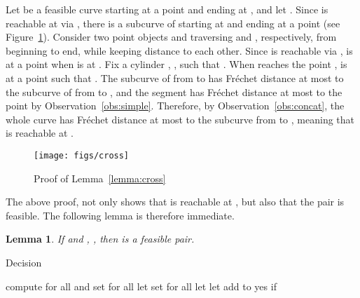 \documentclass[12pt]{dalthesis}
\def\favoritefont{\bfseries \sffamily}
\def\QED{\ensuremath{{\Box}}}
\def\markatright#1{\leavevmode\unskip\nobreak\quad\hspace*{\fill}{#1}}
\newenvironment{proof}
	{\begin{trivlist}\item[\hskip\labelsep{\favoritefont Proof:}]}
	{\markatright{\QED}\end{trivlist}}
\newtheorem{lemma}[theorem]{Lemma}
\newcommand{\Frechet}{Fr\'echet }
\begin{document}
\begin{proof}
	Let  be a feasible curve starting at a point  and ending at ,
	and let .
	Since  is reachable at  via ,
	there is a subcurve  of  starting at  and ending at a point 
	(see Figure~\ref{fig:cross}).
	Consider two point objects  and  
	traversing  and , respectively, from beginning to end,
	while keeping  distance to each other.
	Since  is reachable via ,
	 is at a point  when  is at .
	Fix a cylinder ,  , such that  .
	When  reaches the point , 
	 is at a point  such that .
	The subcurve of  from  to  has \Frechet distance at most 
	to the subcurve of  from  to ,
	and the segment  has \Frechet distance at most  to the point 
	by Observation~\ref{obs:simple}.
	Therefore, by Observation~\ref{obs:concat}, 
	the whole curve  has \Frechet distance at most 
	to the subcurve  from  to ,
	meaning that  is reachable at .
\end{proof}


\begin{figure}[t]
	\centering
	\texttt{[image: figs/cross]}
	\vspace{0.5em}
	\caption{Proof of Lemma~\ref{lemma:cross}}
	\label{fig:cross}
\end{figure}

The above proof, not only shows that 
 is reachable at , 
but also that 
the pair  is feasible.
The following lemma is therefore immediate.

\begin{lemma} \label{lemma:left-point}
	If  and , ,
	then  is a feasible pair.
\end{lemma}





\begin{algorithm} [h]
\caption {{\sc Decision}} 
\label{alg:decCCCG11}
\begin{algorithmic}[1]
	\vspace{0.5em}
	\baselineskip
{}  \label{l:init}
		\STATE \hspace{1.5em}compute  for all  and  \label{l:init-1} 
		\STATE \hspace{1.5em}set  for all  \label{l:init-2} 
		\STATE \hspace{1.5em}let  \label{l:R0} \label{l:init-3} 
		\STATE \hspace{1.5em}set  for all   \label{l:init-4} 
	   \label{l:mainstart}
		\STATE let   \label{l:direct}
		\STATE let   \label{l:min}
		\FORALL {} \label{l:loop1start}
			\IF {} \label{l:cond}
				\STATE add  to  \label{l:reach}
			\ENDIF
		\ENDFOR \label{l:loop1end}
		\FORALL {}  \label{l:rel-1}
				\STATE   \label{l:rel-2}
		\ENDFOR
	\ENDFOR 
	 {\sc yes} if  \label{l:final}

\end{algorithmic}
\end{algorithm}
\end{document}

